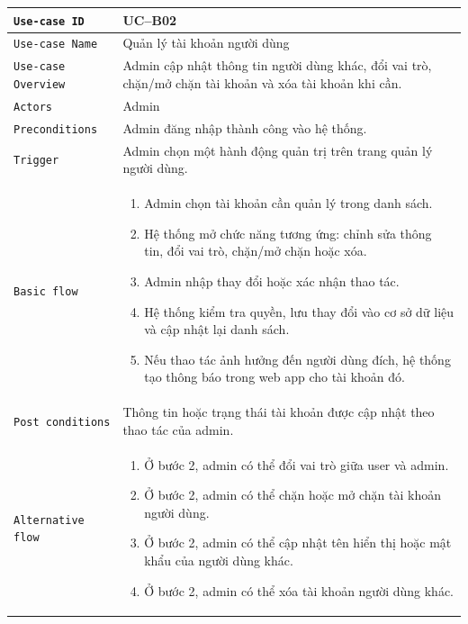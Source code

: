 \begin{longtable}{|P{4.8cm}|m{10cm}|}\hline
	\texttt{Use-case ID} & UC--B02\\
	\hline
	\texttt{Use-case Name} & Quản lý tài khoản người dùng\\
	\hline
	\texttt{Use-case Overview} & Admin cập nhật thông tin người dùng khác, đổi vai trò, chặn/mở chặn tài khoản và xóa tài khoản khi cần.
	\\
	\hline
	\texttt{Actors} & Admin
	\\
	\hline
	\texttt{Preconditions} & Admin đăng nhập thành công vào hệ thống.
	\\
	\hline
	\texttt{Trigger} & Admin chọn một hành động quản trị trên trang quản lý người dùng.\\
	\hline
	\texttt{Basic flow} &
	\begin{enumerate}
		\item Admin chọn tài khoản cần quản lý trong danh sách.
		\item Hệ thống mở chức năng tương ứng: chỉnh sửa thông tin, đổi vai trò, chặn/mở chặn hoặc xóa.
		\item Admin nhập thay đổi hoặc xác nhận thao tác.
		\item Hệ thống kiểm tra quyền, lưu thay đổi vào cơ sở dữ liệu và cập nhật lại danh sách.
		\item Nếu thao tác ảnh hưởng đến người dùng đích, hệ thống tạo thông báo trong web app cho tài khoản đó.
	\end{enumerate}
	\\
	\hline
	\texttt{Post conditions} &
	Thông tin hoặc trạng thái tài khoản được cập nhật theo thao tác của admin.
	\\
	\hline
	\texttt{Alternative flow} &
	\begin{enumerate}[label = A\arabic*.]
		\item Ở bước 2, admin có thể đổi vai trò giữa user và admin.
		\item Ở bước 2, admin có thể chặn hoặc mở chặn tài khoản người dùng.
		\item Ở bước 2, admin có thể cập nhật tên hiển thị hoặc mật khẩu của người dùng khác.
		\item Ở bước 2, admin có thể xóa tài khoản người dùng khác.
	\end{enumerate}
	\\

\end{longtable}
